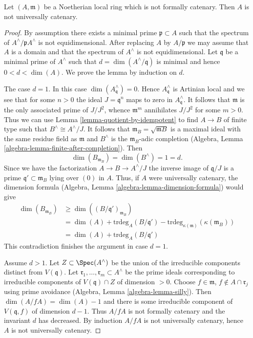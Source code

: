 \begin{lemma}
\label{lemma-not-formally-catenary}
Let $(A, \mathfrak m)$ be a Noetherian local ring which is not
formally catenary. Then $A$ is not universally catenary.
\end{lemma}

\begin{proof}
By assumption there exists a minimal prime $\mathfrak p \subset A$ such that
the spectrum of $A^\wedge /\mathfrak p A^\wedge$ is not equidimensional.
After replacing $A$ by $A/\mathfrak p$ we may assume that $A$
is a domain and that the spectrum of $A^\wedge$ is not equidimensional.
Let $\mathfrak q$ be a minimal prime of
$A^\wedge$ such that $d = \dim(A^\wedge/\mathfrak q)$
is minimal and hence $0 < d < \dim(A)$. We prove the lemma by induction
on $d$.

\medskip\noindent
The case $d = 1$. In this case $\dim(A^\wedge_\mathfrak q) = 0$.
Hence $A^\wedge_\mathfrak q$ is Artinian local and we see that
for some $n > 0$ the ideal $J = \mathfrak q^n$ maps to zero in
$A^\wedge_\mathfrak q$. It follows that $\mathfrak m$ is the
only associated prime of $J/J^2$, whence $\mathfrak m^m$ annihilates
$J/J^2$ for some $m > 0$. Thus we can use
Lemma \ref{lemma-quotient-by-idempotent}
to find $A \to B$ of finite type such that $B^\wedge \cong A^\wedge/J$.
It follows that $\mathfrak m_B = \sqrt{\mathfrak mB}$ is a maximal
ideal with the same residue field as $\mathfrak m$ and $B^\wedge$
is the $\mathfrak m_B$-adic completion
(Algebra, Lemma \ref{algebra-lemma-finite-after-completion}).
Then
$$
\dim(B_{\mathfrak m_B}) = \dim(B^\wedge) = 1 = d.
$$
Since we have the factorization $A \to B \to A^\wedge/J$ the inverse image
of $\mathfrak q/J$ is a prime $\mathfrak q' \subset \mathfrak m_B$ lying
over $(0)$ in $A$. Thus, if $A$ were universally catenary, the dimension
formula (Algebra, Lemma \ref{algebra-lemma-dimension-formula}) would give
\begin{align*}
\dim(B_{\mathfrak m_B})
& \geq
\dim((B/\mathfrak q')_{\mathfrak m_B}) \\
& =
\dim(A) + \text{trdeg}_A(B/\mathfrak q') -
\text{trdeg}_{\kappa(\mathfrak m)}(\kappa(\mathfrak m_B)) \\
& =
\dim(A) + \text{trdeg}_A(B/\mathfrak q')
\end{align*}
This contradiction finishes the argument in case $d = 1$.

\medskip\noindent
Assume $d > 1$. Let $Z \subset \Spec(A^\wedge)$ be the union of
the irreducible components distinct from $V(\mathfrak q)$.
Let $\mathfrak r_1, \ldots, \mathfrak r_m \subset A^\wedge$
be the prime ideals corresponding to irreducible components of
$V(\mathfrak q) \cap Z$ of dimension $> 0$.
Choose $f \in \mathfrak m$, $f \not \in A \cap \mathfrak r_j$
using prime avoidance (Algebra, Lemma \ref{algebra-lemma-silly}).
Then $\dim(A/fA) = \dim(A) - 1$ and there is some irreducible
component of $V(\mathfrak q, f)$ of dimension $d - 1$.
Thus $A/fA$ is not formally catenary and the invariant $d$ has
decreased. By induction $A/fA$ is not universally catenary, hence
$A$ is not universally catenary.
\end{proof}